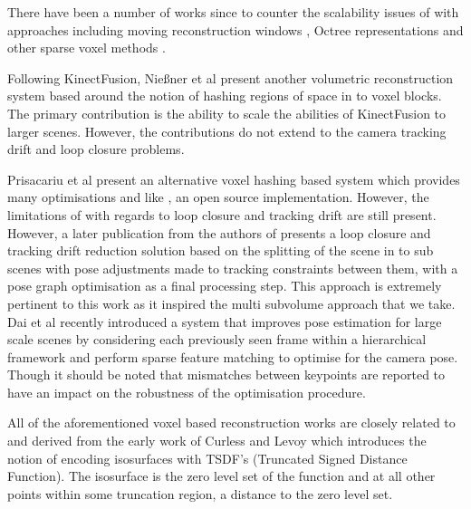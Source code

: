 There have been a number of works since to counter the scalability issues of \cite{Newcombe2011} with approaches including moving reconstruction 
windows \cite{Roth2012, Whelan2012}, Octree representations \cite{Zeng2012} and other sparse voxel methods \cite{Prisacariu2014, Chen2013}.

Following KinectFusion, Nie{\ss}ner et al present another volumetric reconstruction system \cite{Niessner2013} based around the notion of
hashing regions of space in to voxel blocks. The primary contribution is the ability to scale the abilities of KinectFusion to larger
scenes. However, the contributions do not extend to the camera tracking drift and loop closure problems.

Prisacariu et al present an alternative voxel hashing based system \cite{Prisacariu2014} which provides many optimisations and like \cite{Niessner2013}, an open source 
implementation. However, the limitations of \cite{Newcombe2011,Niessner2013} with regards to loop closure and tracking drift are still present. 
However, a later publication \cite{Kahler2016} from the authors of \cite{Prisacariu2014} presents a loop closure and tracking drift reduction 
solution based on the splitting of the scene in to sub scenes with pose adjustments made to tracking constraints between them, with 
a pose graph optimisation as a final processing step. This approach is extremely pertinent to this work as it inspired the multi subvolume approach 
that we take. Dai et al \cite{dai2016bundlefusion} recently introduced a system that improves pose estimation for large scale scenes by considering each previously seen 
frame within a hierarchical framework and perform sparse feature matching to optimise for the camera pose. Though it should be noted that mismatches between keypoints are 
reported to have an impact on the robustness of the optimisation procedure.

All of the aforementioned voxel based reconstruction works are closely related to and derived from the early work of Curless and Levoy \cite{Curless1996} 
which introduces the notion of encoding isosurfaces with TSDF's (Truncated Signed Distance Function). The isosurface is the zero level set of the function 
and at all other points within some truncation region, a distance to the zero level set.
\fi

